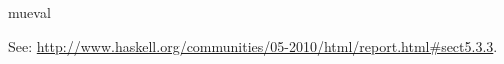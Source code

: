 \begin{hcarentry}{mueval}
\label{mueval}
\makeheader

See: \url{http://www.haskell.org/communities/05-2010/html/report.html#sect5.3.3}.





\end{hcarentry}
